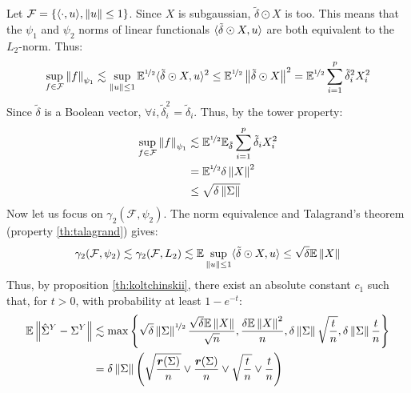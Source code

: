 \documentclass{article}
\numberwithin{equation}{section}
\numberwithin{equation}{section}
\begin{document}
    Let $\mathcal{F} = \lbrace \langle \cdot  , u \rangle, \left\Vert u \right\Vert \leq 1 \rbrace$. Since $X$ is subgaussian, $\tilde{\delta} \odot X$ is too. This means that the $\psi_1$ and $\psi_2$ norms of linear functionals $\langle \tilde{\delta} \odot X , u \rangle$ are both equivalent to the $L_2$-norm. Thus:
    \begin{equation}
    \begin{split}
        \sup_{f\in \mathcal{F}} \left\Vert f \right\Vert_{\psi_{1}} \lesssim \sup_{\left\Vert u \right\Vert \leq 1} \mathbb{E}^{\nicefrac{1}{2}} \langle \tilde{\delta} \odot X , u \rangle^2\leq \mathbb{E}^{\nicefrac{1}{2}} \left\Vert \tilde{\delta}\odot X \right\Vert^2 = \mathbb{E}^{\nicefrac{1}{2}} \sum_{i=1}^p \tilde{\delta}_i^2 X_i^2
    \end{split}
    \end{equation}
    Since $\tilde{\delta}$ is a Boolean vector, $\forall i, \tilde{\delta}_i^2 = \tilde{\delta}_i$. Thus, by the tower property:
    \begin{equation}
    \begin{split}
        \sup_{f\in \mathcal{F}} \left\Vert f \right\Vert_{\psi_{1}} & \lesssim \mathbb{E}^{\nicefrac{1}{2}} \mathbb{E}_{\tilde{\delta}} \sum_{i=1}^p \tilde{\delta}_i X_i^2\\
        & = \mathbb{E}^{\nicefrac{1}{2}} \delta \left\Vert X \right\Vert^2\\
        & \leq \sqrt{\delta \left\Vert \Sigma \right\Vert}
    \end{split}
    \end{equation}
    Now let us focus on $\gamma_2(\mathcal{F}, \psi_2)$. The norm equivalence and Talagrand's theorem (property \ref{th:talagrand}) gives:
    \begin{equation}
       \gamma_2(\mathcal{F}, \psi_2) \lesssim \gamma_2(\mathcal{F}, L_2) \lesssim \mathbb{E} \sup_{\left\Vert u \right\Vert \leq 1} \langle \tilde{\delta} \odot X , u \rangle \leq \sqrt{\delta} \mathbb{E} \left\Vert X \right\Vert
    \end{equation}
    Thus, by proposition \ref{th:koltchinskii}, there exist an absolute constant $c_1$ such that, for $t>0$, with probability at least $1-e^{-t}$:
    \begin{equation}
    \begin{split}
        \mathbb{E} \left\Vert \hat{\Sigma}^Y - \Sigma^Y \right\Vert & \lesssim \max \left\lbrace \sqrt{\delta} \left\Vert \Sigma \right\Vert^{\nicefrac{1}{2}} \frac{\sqrt{\delta}\mathbb{E}\left\Vert X \right\Vert}{\sqrt{n}} , \frac{\delta \mathbb{E}\left\Vert X \right\Vert^2}{n}, \delta\left\Vert \Sigma \right\Vert\sqrt{\frac{t}{n}}, \delta\left\Vert \Sigma \right\Vert \frac{t}{n} \right\rbrace\\
        & = \delta \left\Vert \Sigma \right\Vert \left( \sqrt{\frac{\bm{r}(\Sigma)}{n}} \lor \frac{\bm{r}(\Sigma)}{n} \lor \sqrt{\frac{t}{n}} \lor \frac{t}{n}\right)
    \end{split}
    \end{equation}
    
\end{document}

